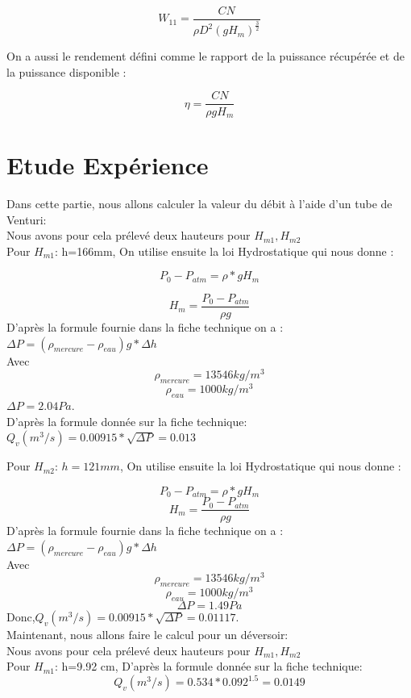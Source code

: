 \documentclass[a4paper,10pt]{report} %
\begin{document}
$$W_{11}=\frac{C N}{\rho D^2 (g H_m)^{\frac{3}{2}}}$$

On a aussi le rendement défini comme le rapport de la puissance récupérée et de la puissance disponible :

$$\eta=\frac{C N}{\rho g H_m}$$

\chapter{Etude Expérience} 

Dans cette partie, nous allons calculer la valeur du débit à l'aide d'un tube de Venturi:\\
Nous avons pour cela prélevé deux hauteurs pour $H_{m1},H_{m2}$\\
Pour $H_{m1}$: h=166mm,
On utilise ensuite la loi Hydrostatique qui nous donne :

$$P_{0}-P_{atm}=\rho*g H_m$$

$$H_m=\frac{P_0-P_{atm}}{\rho g}$$
D'après la formule fournie dans la fiche technique on a :\\
$\Delta{P}=(\rho_{mercure}-\rho_{eau})g *\Delta{h}$\\
Avec $$\rho_{mercure}=13546 kg/m^3$$
$$\rho_{eau}=1000 kg/m^3$$
$\Delta{P}=2.04 Pa$.\\

D'après la formule donnée sur la fiche technique:\\
$Q_{v}(m^{3}/s)=0.00915*\sqrt{\Delta{P}}=0.013$


Pour $H_{m2}$: $h=121mm$,
On utilise ensuite la loi Hydrostatique qui nous donne :

$$P_{0}-P_{atm}=\rho*g H_m$$
$$H_m=\frac{P_0-P_{atm}}{\rho g}$$
D'après la formule fournie dans la fiche technique on a :\\
$\Delta{P}=(\rho_{mercure}-\rho_{eau})g *\Delta{h}$\\
Avec $$\rho_{mercure}=13546 kg/m^3$$
$$\rho_{eau}=1000 kg/m^3$$
$$\Delta{P}=1.49 Pa$$
Donc,$Q_{v}(m^{3}/s)=0.00915*\sqrt{\Delta{P}}=0.01117$.\\

Maintenant, nous allons faire le calcul pour un déversoir:\\
Nous avons pour cela prélevé deux hauteurs pour $H_{m1},H_{m2}$\\

Pour $H_{m1}$: h=9.92 cm,
D'après la formule donnée sur la fiche technique:\\
$$Q_{v}(m^{3}/s)=0.534*0.092^{1.5}=0.0149$$
\end{document}
